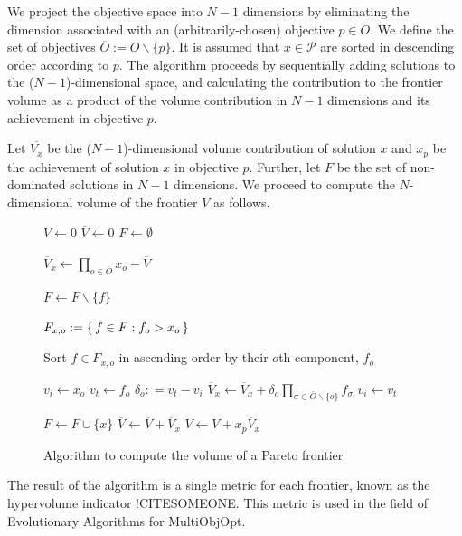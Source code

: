 We project the objective space into $N-1$ dimensions by eliminating the dimension associated with an (arbitrarily-chosen) objective $p \in O$. We define the set of objectives $\overbar{O} := O \backslash \{p\}$. It is assumed that $x \in \mathcal{P}$ are sorted in descending order according to $p$. The algorithm proceeds by sequentially adding solutions to the ($N-1$)-dimensional space, and calculating the contribution to the frontier volume as a product of the volume contribution in $N-1$ dimensions and its achievement in objective $p$.

Let
$\overbar{V_x}$ be the ($N-1$)-dimensional volume contribution of solution $x$ and
$x_p$ be the achievement of solution $x$ in objective $p$. Further, let
$F$ be the set of non-dominated solutions in $N-1$ dimensions.
We proceed to compute the $N$-dimensional volume of the frontier $V$ as follows.

\begin{figure}[!ht]
\caption{Algorithm to compute the volume of a Pareto frontier}
\begin{algorithmic}[1]

\State $V \gets 0$
\State $\overbar{V} \gets 0$
\State $F \gets \emptyset$


	\State $\overbar{V}_x \gets \prod_{o \in \overbar{O}} x_{o} - \overbar{V}$
		
			\State $F \gets F \backslash \{f\}$
		\EndIf
	\EndFor
	
	
		\State $F_{x,o} := \set{f \in F : f_o > x_o}$
		
		\State Sort $f \in F_{x,o}$ in ascending order by their $o$th component, $f_o$
		
		\State $v_i \gets x_o$
			\State $v_t \gets f_o$
			\State $\delta_o :	= v_t - v_i$
			\State $\overbar{V}_x \gets \overbar{V}_x + \delta_o \prod_{\sigma \in \overbar{O} \backslash \{o\}} f_\sigma$
			\State $v_i \gets v_t$
		\EndFor
		
	\EndFor
	
	\State $F \gets F \cup \{x\}$
	\State $\overbar{V} \gets \overbar{V} + \overbar{V}_x$
	\State $V \gets V + x_p \overbar{V}_x$
\EndFor


\end{algorithmic}
\end{figure}

The result of the algorithm is a single metric for each frontier, known as the hypervolume indicator !CITESOMEONE. This metric is used in the field of Evolutionary Algorithms for MultiObjOpt. 